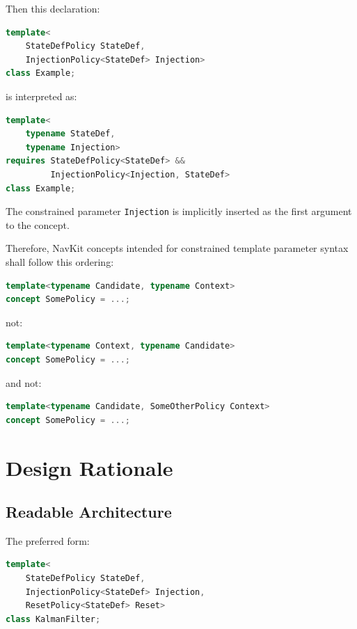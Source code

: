 \documentclass[11pt]{article}
\begin{document}
Then this declaration:

\begin{lstlisting}[language=C++]
template<
    StateDefPolicy StateDef,
    InjectionPolicy<StateDef> Injection>
class Example;
\end{lstlisting}

is interpreted as:

\begin{lstlisting}[language=C++]
template<
    typename StateDef,
    typename Injection>
requires StateDefPolicy<StateDef> &&
         InjectionPolicy<Injection, StateDef>
class Example;
\end{lstlisting}

The constrained parameter \texttt{Injection} is implicitly inserted as the
first argument to the concept.

Therefore, NavKit concepts intended for constrained template parameter syntax
shall follow this ordering:

\begin{lstlisting}[language=C++]
template<typename Candidate, typename Context>
concept SomePolicy = ...;
\end{lstlisting}

not:

\begin{lstlisting}[language=C++]
template<typename Context, typename Candidate>
concept SomePolicy = ...;
\end{lstlisting}

and not:

\begin{lstlisting}[language=C++]
template<typename Candidate, SomeOtherPolicy Context>
concept SomePolicy = ...;
\end{lstlisting}

\section{Design Rationale}

\subsection{Readable Architecture}

The preferred form:

\begin{lstlisting}[language=C++]
template<
    StateDefPolicy StateDef,
    InjectionPolicy<StateDef> Injection,
    ResetPolicy<StateDef> Reset>
class KalmanFilter;
\end{lstlisting}
\end{document}
